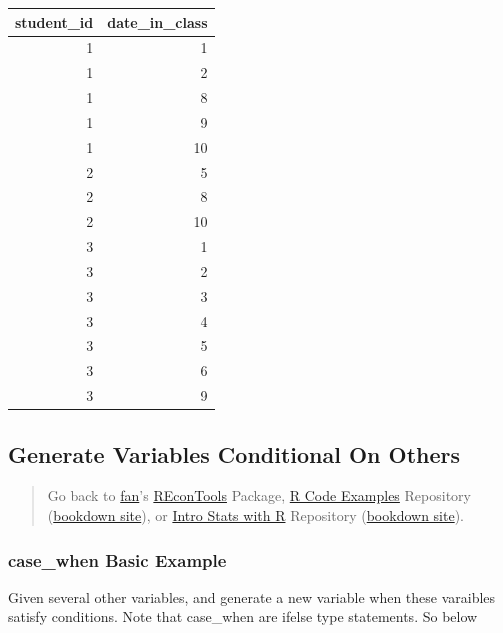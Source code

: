 \documentclass[
]{book}
\begin{document}
\begin{table}[!h]
\centering
\begin{tabular}{r|r}
\hline
student\_id & date\_in\_class\\
\hline
\rowcolor{gray!6}  1 & 1\\
\hline
1 & 2\\
\hline
\rowcolor{gray!6}  1 & 8\\
\hline
1 & 9\\
\hline
\rowcolor{gray!6}  1 & 10\\
\hline
2 & 5\\
\hline
\rowcolor{gray!6}  2 & 8\\
\hline
2 & 10\\
\hline
\rowcolor{gray!6}  3 & 1\\
\hline
3 & 2\\
\hline
\rowcolor{gray!6}  3 & 3\\
\hline
3 & 4\\
\hline
\rowcolor{gray!6}  3 & 5\\
\hline
3 & 6\\
\hline
\rowcolor{gray!6}  3 & 9\\
\hline
\end{tabular}
\end{table}

\hypertarget{generate-variables-conditional-on-others}{%
\subsection{Generate Variables Conditional On Others}\label{generate-variables-conditional-on-others}}

\begin{quote}
Go back to \href{http://fanwangecon.github.io/}{fan}'s \href{https://fanwangecon.github.io/REconTools/}{REconTools} Package, \href{https://fanwangecon.github.io/R4Econ/}{R Code Examples} Repository (\href{https://fanwangecon.github.io/R4Econ/bookdown}{bookdown site}), or \href{https://fanwangecon.github.io/Stat4Econ/}{Intro Stats with R} Repository (\href{https://fanwangecon.github.io/Stat4Econ/bookdown}{bookdown site}).
\end{quote}

\hypertarget{case_when-basic-example}{%
\subsubsection{case\_when Basic Example}\label{case_when-basic-example}}

Given several other variables, and generate a new variable when these varaibles satisfy conditions. Note that case\_when are ifelse type statements. So below
\end{document}
